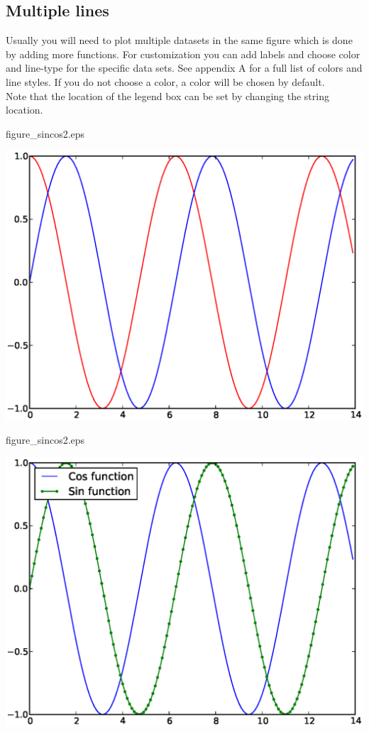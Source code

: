 \documentclass{article}
\begin{document}
\newpage
\subsection{Multiple lines}

Usually you will need to plot multiple datasets in the same figure which is done
by adding more  functions.
For customization you can add labels and choose color and line-type for the specific data sets.
See appendix A for a full list of colors and line styles.
If you do not choose a color, a color will be chosen by default.\\

Note that the location of the legend box can be set by changing the string location.

\begin{multicols}{2}

    

\columnbreak

    \centering

    figure\_sincos2.eps

    \includegraphics[width=1.0\linewidth]{py/figure_sincos1.eps}

    figure\_sincos2.eps

    \includegraphics[width=1.0\linewidth]{py/figure_sincos2.eps}

\end{multicols}
\end{document}
